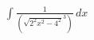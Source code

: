 \documentclass[preview]{standalone}
\begin{document}
\begin{align*}
\int \frac{1}{(\sqrt{2^2x^2-4^2}^3)} \, dx
\end{align*}
\end{document}
